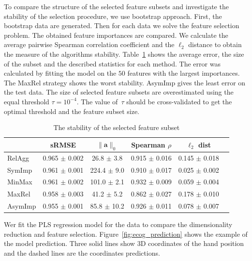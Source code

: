 \documentclass[12pt,oneside]{article}
\theoremstyle{definition}
\newcommand{\ba}{\mathbf{a}}
\begin{document}
To compare the structure of the selected feature subsets and investigate the stability of the selection procedure, we use bootstrap approach. 
First, the bootstrap data are generated. 
Then for each data we solve the feature selection problem.
The obtained feature importances are compared. 
We calculate the average pairwise Spearman correlation coefficient and the $\ell_2$ distance to obtain the measure of the algorithms stability.
Table~\ref{tbl:stability} shows the average error, the size of the subset and the described statistics for each method. The error was calculated by fitting the model on the $50$ features with the largest importances.
The MaxRel strategy shows the worst stability.
AsymImp gives the least error on the test data. 
The size of selected feature subsets are overestimated using the equal threshold $\tau=10^{-4}$. 
The value of~$\tau$ should be cross-validated to get the optimal threshold and the feature subset size. 

\begin{table}[]
	\caption{The stability of the selected feature subset}
	\centering
	\begin{tabular}{l|ccccc}
		\hline
		& sRMSE  & $\|\ba\|_0$ & Spearman $\rho$ & $\ell_2$ dist \\ \hline
		RelAgg & 0.965 $\pm$ 0.002 & 26.8 $\pm$ 3.8 & 0.915 $\pm$ 0.016 & 0.145 $\pm$ 0.018   \\
		SymImp & 0.961 $\pm$ 0.001 & 224.4 $\pm$ 9.0 & 0.910 $\pm$ 0.017 & 0.025 $\pm$ 0.002   \\
		MinMax & 0.961 $\pm$ 0.002 & 101.0 $\pm$ 2.1& 0.932 $\pm$ 0.009 & 0.059 $\pm$ 0.004   \\
		MaxRel & 0.958 $\pm$ 0.003 & 41.2 $\pm$ 5.2 & 0.862 $\pm$ 0.027 & 0.178 $\pm$ 0.010   \\
		AsymImp & 0.955 $\pm$ 0.001 & 85.8 $\pm$ 10.2& 0.926 $\pm$ 0.011 & 0.078 $\pm$ 0.007  \\ \hline
	\end{tabular}
	\label{tbl:stability}
\end{table}

Wer fit the PLS regression model for the data to compare the dimensionality reduction and feature selection. 
Figure~\ref{fig:ecog_prediction} shows the example of the model prediction. Three solid lines show 3D coordinates of the hand position and the dashed lines are the coordinates predictions.
\end{document}
